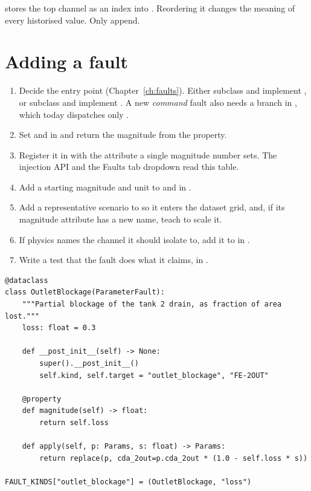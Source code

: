 \begin{warn}
 stores the top channel as an index into .
Reordering it changes the meaning of every historised value. Only append.
\end{warn}

\section{Adding a fault}

\begin{enumerate}
  \item Decide the entry point (Chapter~\ref{ch:faults}). Either subclass
         and implement , or subclass
         and implement . A new
        \emph{command} fault also
        needs a branch in , which today dispatches
        only .
  \item Set  and  in  and return
        the magnitude from the  property.
  \item Register it in  with the attribute a single
        magnitude number sets. The injection API and the Faults tab dropdown
        read this table.
  \item Add a starting magnitude and unit to  and
         in .
  \item Add a representative scenario to  so it enters the
        dataset grid, and, if its magnitude attribute has a new name, teach
         to scale it.
  \item If physics names the channel it should isolate to, add it to
         in .
  \item Write a test that the fault does what it claims, in
        .
\end{enumerate}

\begin{lstlisting}
@dataclass
class OutletBlockage(ParameterFault):
    """Partial blockage of the tank 2 drain, as fraction of area lost."""
    loss: float = 0.3

    def __post_init__(self) -> None:
        super().__post_init__()
        self.kind, self.target = "outlet_blockage", "FE-2OUT"

    @property
    def magnitude(self) -> float:
        return self.loss

    def apply(self, p: Params, s: float) -> Params:
        return replace(p, cda_2out=p.cda_2out * (1.0 - self.loss * s))

FAULT_KINDS["outlet_blockage"] = (OutletBlockage, "loss")
\end{lstlisting}

